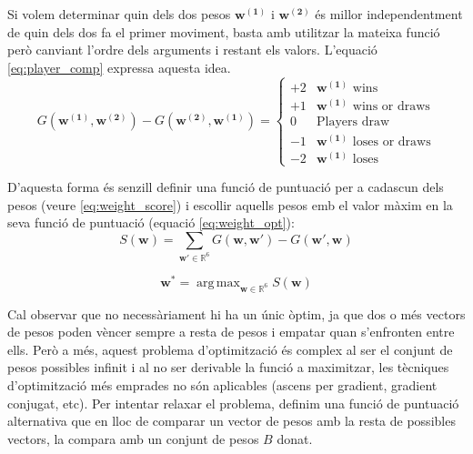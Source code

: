 \documentclass[12pt,a4paper]{article}
\DeclareMathOperator*{\argmax}{arg\,max}
\begin{document}
Si volem determinar quin dels dos pesos $\mathbf{w^{(1)}}$ i $\mathbf{w^{(2)}}$ és millor independentment de quin dels dos fa el primer moviment, basta amb utilitzar la mateixa funció però canviant l'ordre dels arguments i restant els valors. L'equació \ref{eq:player_comp} expressa aquesta idea.\\ 

\begin{equation}\label{eq:player_comp}
G(\mathbf{w^{(1)}}, \mathbf{w^{(2)}}) - G(\mathbf{w^{(2)}}, \mathbf{w^{(1)}}) = \begin{cases}
+2 & \mathbf{w^{(1)}} \text{ wins}\\
+1 & \mathbf{w^{(1)}} \text{ wins or draws}\\
0 & \text{Players draw} \\
-1 & \mathbf{w^{(1)}} \text{ loses or draws} \\
-2 & \mathbf{w^{(1)}} \text{ loses}
\end{cases}
\end{equation}

D'aquesta forma és senzill definir una funció de puntuació per a cadascun dels pesos (veure \ref{eq:weight_score}) i escollir aquells pesos emb el valor màxim en la seva funció de puntuació (equació \ref{eq:weight_opt}):\\

\begin{equation}\label{eq:weight_score}
S(\mathbf{w}) = \sum_{\mathbf{w'} \in \mathbb{R}^6} G(\mathbf{w}, \mathbf{w'}) - G(\mathbf{w'}, \mathbf{w})
\end{equation}

\begin{equation}\label{eq:weight_opt}
\mathbf{w^*} = \argmax_{\mathbf{w} \in \mathbb{R}^6} S(\mathbf{w})
\end{equation}

Cal observar que no necessàriament hi ha un únic òptim, ja que dos o més vectors de pesos poden vèncer sempre a resta de pesos i empatar quan s'enfronten entre ells. Però a més, aquest problema d'optimització és complex al ser el conjunt de pesos possibles infinit i al no ser derivable la funció a maximitzar, les tècniques d'optimització més emprades no són aplicables (ascens per gradient, gradient conjugat, etc). Per intentar relaxar el problema, definim una funció de puntuació alternativa que en lloc de comparar un vector de pesos amb la resta de possibles vectors, la compara amb un conjunt de pesos $B$ donat.\\
\end{document}
